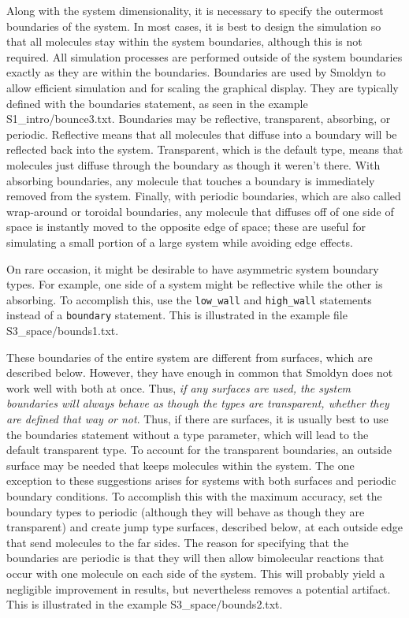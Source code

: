 \documentclass {scrbook}
\newcommand {\ttt} {\texttt}
\begin{document}
Along with the system dimensionality, it is necessary to specify the outermost boundaries of the system. In most cases, it is best to design the simulation so that all molecules stay within the system boundaries, although this is not required. All simulation processes are performed outside of the system boundaries exactly as they are within the boundaries. Boundaries are used by Smoldyn to allow efficient simulation and for scaling the graphical display. They are typically defined with the boundaries statement, as seen in the example S1\_intro/bounce3.txt. Boundaries may be reflective, transparent, absorbing, or periodic. Reflective means that all molecules that diffuse into a boundary will be reflected back into the system. Transparent, which is the default type, means that molecules just diffuse through the boundary as though it weren't there. With absorbing boundaries, any molecule that touches a boundary is immediately removed from the system. Finally, with periodic boundaries, which are also called wrap-around or toroidal boundaries, any molecule that diffuses off of one side of space is instantly moved to the opposite edge of space; these are useful for simulating a small portion of a large system while avoiding edge effects.

On rare occasion, it might be desirable to have asymmetric system boundary types. For example, one side of a system might be reflective while the other is absorbing. To accomplish this, use the \ttt{low\_wall} and \ttt{high\_wall} statements instead of a \ttt{boundary} statement. This is illustrated in the example file S3\_space/bounds1.txt.

These boundaries of the entire system are different from surfaces, which are described below. However, they have enough in common that Smoldyn does not work well with both at once. Thus, \textit{if any surfaces are used, the system boundaries will always behave as though the types are transparent, whether they are defined that way or not}. Thus, if there are surfaces, it is usually best to use the boundaries statement without a type parameter, which will lead to the default transparent type. To account for the transparent boundaries, an outside surface may be needed that keeps molecules within the system. The one exception to these suggestions arises for systems with both surfaces and periodic boundary conditions. To accomplish this with the maximum accuracy, set the boundary types to periodic (although they will behave as though they are transparent) and create jump type surfaces, described below, at each outside edge that send molecules to the far sides. The reason for specifying that the boundaries are periodic is that they will then allow bimolecular reactions that occur with one molecule on each side of the system. This will probably yield a negligible improvement in results, but nevertheless removes a potential artifact. This is illustrated in the example S3\_space/bounds2.txt.
\end{document}
